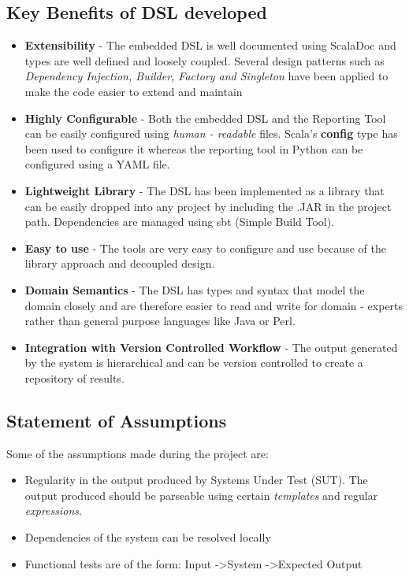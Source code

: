\subsection{Key Benefits of DSL developed}
\begin{itemize}

\item \textbf{Extensibility} - The embedded DSL is well documented using ScalaDoc and types are well defined and loosely coupled. Several design patterns such as \textit{Dependency Injection, Builder, Factory and Singleton} have been applied to make the code easier to extend and maintain

\item \textbf{Highly Configurable} - Both the embedded DSL and the Reporting Tool can be easily configured using \textit{human - readable} files. Scala's \textbf{config} type has been used to configure it whereas the reporting tool in Python can be configured using a YAML file.

\item \textbf{Lightweight Library} - The DSL has been implemented as a library that 
can be easily dropped into any project by including the .JAR in the project path. Dependencies are managed using sbt (Simple Build Tool).

\item \textbf{Easy to use} - The tools are very easy to configure and use because of the library approach and decoupled design.

\item \textbf{Domain Semantics} - The DSL has types and syntax that model the domain closely and are therefore easier to read and write for domain - experts rather than general purpose languages like Java or Perl.

\item \textbf{Integration with Version Controlled Workflow} - The output generated by the system is hierarchical and can be version controlled to create a repository of results.
\end{itemize}

\subsection{Statement of Assumptions}

Some of the assumptions made during the project are:
\begin{itemize}
\item Regularity in the output produced by Systems Under Test (SUT). The output produced should be parseable using certain \textit{templates} and regular \textit{expressions}.
\item Dependencies of the system can be resolved locally
\item Functional tests are of the form: Input -\textgreater System -\textgreater Expected Output
\end{itemize}
\newpage
